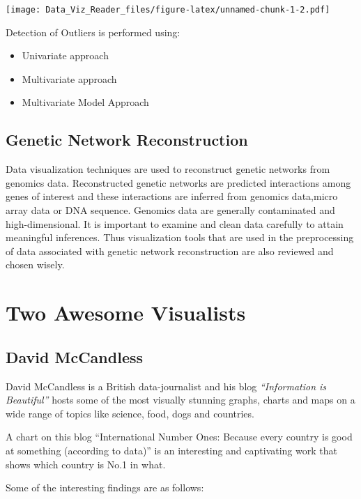 \documentclass[]{book}
\providecommand{\tightlist}{%
  \setlength{\itemsep}{0pt}\setlength{\parskip}{0pt}}
\theoremstyle{definition}
\theoremstyle{definition}
\theoremstyle{definition}
\theoremstyle{remark}
\begin{document}
\texttt{[image: Data\_Viz\_Reader\_files/figure-latex/unnamed-chunk-1-2.pdf]}

Detection of Outliers is performed using:

\begin{itemize}
\tightlist
\item
  Univariate approach
\item
  Multivariate approach
\item
  Multivariate Model Approach
\end{itemize}

\subsection{Genetic Network
Reconstruction}\label{genetic-network-reconstruction}

Data visualization techniques are used to reconstruct genetic networks
from genomics data. Reconstructed genetic networks are predicted
interactions among genes of interest and these interactions are inferred
from genomics data,micro array data or DNA sequence. Genomics data are
generally contaminated and high-dimensional. It is important to examine
and clean data carefully to attain meaningful inferences. Thus
visualization tools that are used in the preprocessing of data
associated with genetic network reconstruction are also reviewed and
chosen wisely.

\section{Two Awesome Visualists}\label{two-awesome-visualists}

\subsection{David McCandless}\label{david-mccandless}

David McCandless is a British data-journalist and his blog
\emph{``Information is Beautiful''} \citep{info_beautiful} hosts some of
the most visually stunning graphs, charts and maps on a wide range of
topics like science, food, dogs and countries.

A chart on this blog ``International Number Ones: Because every country
is good at something (according to data)'' is an interesting and
captivating work that shows which country is No.1 in what.
\citep{country_chart}

Some of the interesting findings are as follows:
\end{document}
